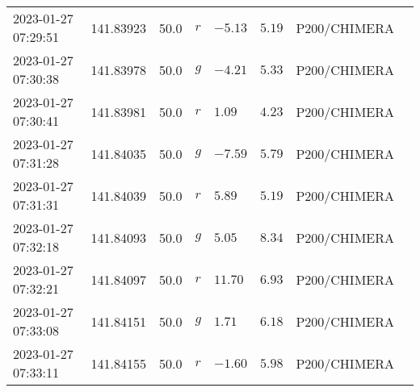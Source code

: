 \documentclass{nature_plusfigure}
\begin{document}
\begin{supplement}
\begin{center}
\begin{longtable}{llllllll}
2023-01-27 07:29:51 & 141.83923 & 50.0 & $r$ & $-5.13$ & $5.19$ & P200/CHIMERA &  \\ 
2023-01-27 07:30:38 & 141.83978 & 50.0 & $g$ & $-4.21$ & $5.33$ & P200/CHIMERA &  \\ 
2023-01-27 07:30:41 & 141.83981 & 50.0 & $r$ & $1.09$ & $4.23$ & P200/CHIMERA &  \\ 
2023-01-27 07:31:28 & 141.84035 & 50.0 & $g$ & $-7.59$ & $5.79$ & P200/CHIMERA &  \\ 
2023-01-27 07:31:31 & 141.84039 & 50.0 & $r$ & $5.89$ & $5.19$ & P200/CHIMERA &  \\ 
2023-01-27 07:32:18 & 141.84093 & 50.0 & $g$ & $5.05$ & $8.34$ & P200/CHIMERA &  \\ 
2023-01-27 07:32:21 & 141.84097 & 50.0 & $r$ & $11.70$ & $6.93$ & P200/CHIMERA &  \\ 
2023-01-27 07:33:08 & 141.84151 & 50.0 & $g$ & $1.71$ & $6.18$ & P200/CHIMERA &  \\ 
2023-01-27 07:33:11 & 141.84155 & 50.0 & $r$ & $-1.60$ & $5.98$ & P200/CHIMERA &  \\ 
\hline 
\end{longtable} 
\end{center} 



\clearpage


\end{supplement}
\end{document}
